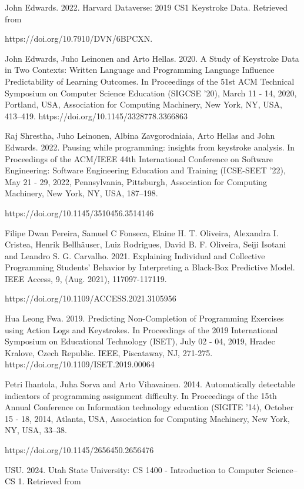 \documentclass[sigconf,final]{acmart}
\begin{document}
\begin{thebibliography}{99}
 John Edwards. 2022. Harvard Dataverse: 2019 CS1 Keystroke Data. Retrieved from

{https://doi.org/10.7910/DVN/6BPCXN.}

John Edwards, Juho Leinonen and Arto Hellas. 2020. A Study of Keystroke Data in Two Contexts: Written Language and Programming Language Influence Predictability of Learning Outcomes. In Proceedings of the 51st ACM Technical Symposium on Computer Science Education (SIGCSE '20), March 11 - 14, 2020, Portland, USA, Association for Computing Machinery, New York, NY, USA, 413–419.
{https://doi.org/10.1145/3328778.3366863}

Raj Shrestha, Juho Leinonen, Albina Zavgorodniaia, Arto Hellas and John Edwards. 2022. Pausing while programming: insights from keystroke analysis. In Proceedings of the ACM/IEEE 44th International Conference on Software Engineering: Software Engineering Education and Training (ICSE-SEET '22), May 21 - 29, 2022, Pennsylvania, Pittsburgh, Association for Computing Machinery, New York, NY, USA, 187–198.

{https://doi.org/10.1145/3510456.3514146}

Filipe Dwan Pereira, Samuel C Fonseca, Elaine H. T. Oliveira, Alexandra I. Cristea, Henrik Bellhäuser, Luiz Rodrigues, David B. F. Oliveira, Seiji Isotani and Leandro S. G. Carvalho. 2021. Explaining Individual and Collective Programming Students’ Behavior by Interpreting a Black-Box Predictive Model. IEEE Access, 9, (Aug. 2021), 117097-117119. 

{https://doi.org/10.1109/ACCESS.2021.3105956}

Hua Leong Fwa. 2019. Predicting Non-Completion of Programming Exercises using Action Logs and Keystrokes. In Proceedings of the 2019 International Symposium on Educational Technology (ISET), July 02 - 04, 2019, Hradec Kralove, Czech Republic. IEEE, Piscataway, NJ, 271-275. 
{https://doi.org/10.1109/ISET.2019.00064}

Petri Ihantola, Juha Sorva and Arto Vihavainen. 2014. Automatically detectable indicators of programming assignment difficulty. In Proceedings of the 15th Annual Conference on Information technology education (SIGITE '14), October 15 - 18, 2014, Atlanta, USA, Association for Computing Machinery, New York, NY, USA, 33–38.

{https://doi.org/10.1145/2656450.2656476}

USU. 2024. Utah State University: CS 1400 - Introduction to Computer Science–CS 1. Retrieved from  


\end{thebibliography}
\end{document}
